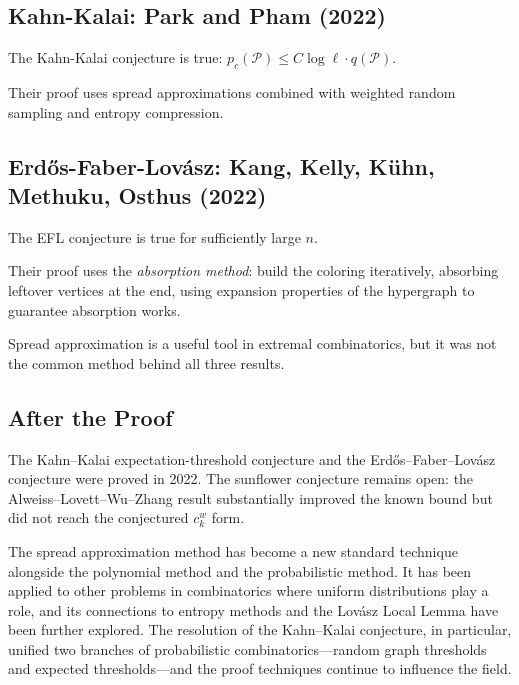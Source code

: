 \subsection{Kahn-Kalai: Park and Pham (2022)}

\begin{theorem}
The Kahn-Kalai conjecture is true: $p_c(\mathcal{P}) \le C \log \ell \cdot q(\mathcal{P})$.
\end{theorem}

Their proof uses spread approximations combined with weighted random sampling and entropy compression.

\subsection{Erd\H{o}s-Faber-Lov\'{a}sz: Kang, Kelly, K\"{u}hn, Methuku, Osthus (2022)}

\begin{theorem}
The EFL conjecture is true for sufficiently large $n$.
\end{theorem}

Their proof uses the \emph{absorption method}: build the coloring iteratively, absorbing leftover vertices at the end, using expansion properties of the hypergraph to guarantee absorption works.

\begin{highlightbox}
Spread approximation is a useful tool in extremal combinatorics, but it was not the common method behind all three results.
\end{highlightbox}

\subsection{After the Proof}

The Kahn--Kalai expectation-threshold conjecture and the Erd\H{o}s--Faber--Lov\'{a}sz conjecture were proved in 2022. The sunflower conjecture remains open: the Alweiss--Lovett--Wu--Zhang result substantially improved the known bound but did not reach the conjectured $c_k^w$ form.

The spread approximation method has become a new standard technique alongside the polynomial method and the probabilistic method. It has been applied to other problems in combinatorics where uniform distributions play a role, and its connections to entropy methods and the Lov\'{a}sz Local Lemma have been further explored. The resolution of the Kahn--Kalai conjecture, in particular, unified two branches of probabilistic combinatorics---random graph thresholds and expected thresholds---and the proof techniques continue to influence the field.

